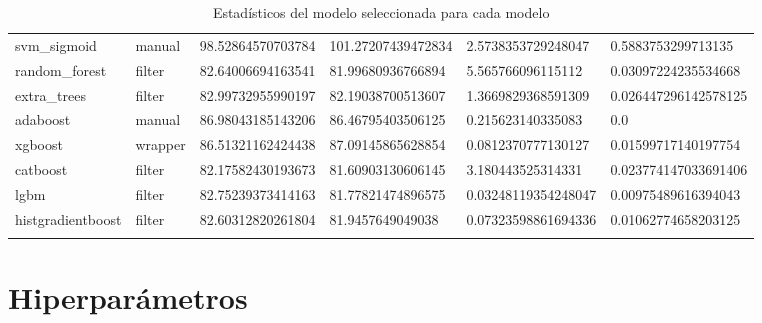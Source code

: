 {\begin{longtable}[c]{@{}llllll@{}}
	svm\_sigmoid         & manual               & 98.52864570703784 & 101.27207439472834 & 2.5738353729248047   & 0.5883753299713135   \\
	\rowcolor[HTML]{EFEFEF} 
	random\_forest       & filter               & 82.64006694163541 & 81.99680936766894  & 5.565766096115112    & 0.03097224235534668  \\
	extra\_trees         & filter               & 82.99732955990197 & 82.19038700513607  & 1.3669829368591309   & 0.026447296142578125 \\
	\rowcolor[HTML]{EFEFEF} 
	adaboost             & manual               & 86.98043185143206 & 86.46795403506125  & 0.215623140335083    & 0.0                  \\
	xgboost              & wrapper              & 86.51321162424438 & 87.09145865628854  & 0.0812370777130127   & 0.01599717140197754  \\
	\rowcolor[HTML]{EFEFEF} 
	catboost             & filter               & 82.17582430193673 & 81.60903130606145  & 3.180443525314331    & 0.023774147033691406 \\
	lgbm                 & filter               & 82.75239373414163 & 81.77821474896575  & 0.03248119354248047  & 0.00975489616394043  \\
	\rowcolor[HTML]{EFEFEF} 
	histgradientboost    & filter               & 82.60312820261804 & 81.9457649049038   & 0.07323598861694336  & 0.01062774658203125  \\* \bottomrule
	\caption{Estadísticos del modelo seleccionada para cada modelo}
	\label{tab:annexvalidation}\\
\end{longtable}}

\section{Hiperparámetros}